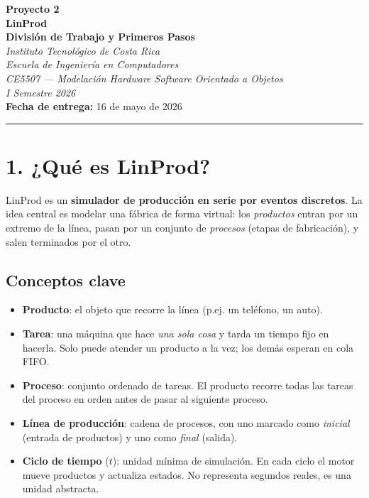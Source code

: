 \documentclass[12pt,letterpaper]{article}
\begin{document}
\begin{center}
    {\Large\bfseries Proyecto 2}\\[0.3em]
    {\LARGE\bfseries\color{tecred} LinProd}\\[0.5em]
    {\large\bfseries División de Trabajo y Primeros Pasos}\\[1em]
    \textit{Instituto Tecnológico de Costa Rica}\\
    \textit{Escuela de Ingeniería en Computadores}\\
    \textit{CE5507 --- Modelación Hardware Software Orientado a Objetos}\\
    \textit{I Semestre 2026}\\[1em]
    \textbf{Fecha de entrega:} 16 de mayo de 2026
\end{center}

\vspace{0.5em}
\hrule
\vspace{1em}

\section*{1. ¿Qué es LinProd?}

LinProd es un \textbf{simulador de producción en serie por eventos discretos}. La idea central es modelar una fábrica de forma virtual: los \emph{productos} entran por un extremo de la línea, pasan por un conjunto de \emph{procesos} (etapas de fabricación), y salen terminados por el otro.

\subsection*{Conceptos clave}

\begin{itemize}[leftmargin=2em]
    \item \textbf{Producto}: el objeto que recorre la línea (p.ej. un teléfono, un auto).
    \item \textbf{Tarea}: una máquina que hace \emph{una sola cosa} y tarda un tiempo fijo en hacerla. Solo puede atender un producto a la vez; los demás esperan en cola FIFO.
    \item \textbf{Proceso}: conjunto ordenado de tareas. El producto recorre todas las tareas del proceso en orden antes de pasar al siguiente proceso.
    \item \textbf{Línea de producción}: cadena de procesos, con uno marcado como \emph{inicial} (entrada de productos) y uno como \emph{final} (salida).
    \item \textbf{Ciclo de tiempo} (\(t\)): unidad mínima de simulación. En cada ciclo el motor mueve productos y actualiza estados. No representa segundos reales, es una unidad abstracta.
\end{itemize}
\end{document}
